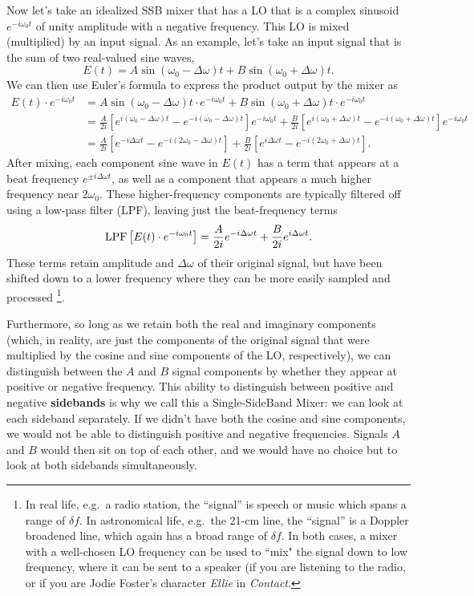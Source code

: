 \documentclass[12pt,preprint]{aastex}
\begin{document}
Now let's take an idealized SSB mixer that has a LO that
is a complex sinusoid $e^{-i\omega_0t}$ of unity amplitude with a negative frequency.  
This LO is mixed (multiplied) by an input signal. As an example, let's take an input signal
that is the sum of two real-valued sine waves,
\begin{equation}
E(t)=A\sin (\omega_0-\Delta\omega)t + B \sin (\omega_0+\Delta\omega)t.
\end{equation}
We can then use Euler's formula to express the product output by the mixer as
\begin{align}
E(t)\cdot e^{-i\omega_0t} &= A\sin (\omega_0-\Delta\omega)t\cdot e^{-i\omega_0t} + B \sin (\omega_0+\Delta\omega)t \cdot e^{-i\omega_0t}\\
&= \frac{A}{2i}\left[e^{i(\omega_0-\Delta\omega)t}-e^{-i(\omega_0-\Delta\omega)t}\right]e^{-i\omega_0t} +
  \frac{B}{2i}\left[e^{i(\omega_0+\Delta\omega)t}-e^{-i(\omega_0+\Delta\omega)t}\right]e^{-i\omega_0t}\\
&= \frac{A}{2i}\left[e^{-i\Delta\omega t}-e^{-i(2\omega_0-\Delta\omega)t}\right] +
  \frac{B}{2i}\left[e^{i\Delta\omega t}-e^{-i(2\omega_0+\Delta\omega)t}\right].
\end{align}
After mixing, each component sine wave in $E(t)$ has a term that appears at a beat frequency 
$e^{\pm i \Delta\omega t}$, as well as a component that appears a much higher frequency near $2\omega_0$.
These higher-frequency components are typically filtered off using a low-pass filter (LPF), leaving just the
beat-frequency terms
\begin{equation}
{\rm LPF}\left[E(t)\cdot e^{-i\omega_0t}\right] =
  \frac{A}{2i}e^{-i\Delta\omega t} + \frac{B}{2i} e^{i\Delta\omega t}.
\end{equation}
These terms retain amplitude and $\Delta\omega$ of their original signal, but have been shifted down
to a lower frequency where they can be more easily sampled and processed%
\footnote{In real life, e.g.\ a radio station, the ``signal'' is
speech or music which spans a range of $\delta f$. In astronomical life,
e.g.\ the 21-cm line, the ``signal'' is a Doppler broadened line, which
again has a broad range of $\delta f$.  In both cases, a mixer with a well-chosen
LO frequency can be used to ``mix" the signal down to low frequency, where it can
be sent to a speaker (if you are listening to the radio, or if you are Jodie Foster's
character {\it Ellie} in {\it Contact}.}.

Furthermore, so long as we retain both the real and imaginary components (which,
in reality, are just the components of the original signal that were multiplied by 
the cosine and sine components of the LO, respectively), we can distinguish 
between the $A$ and $B$ signal components by whether they appear at positive or negative
frequency.  This ability to distinguish between positive and negative {\bf sidebands}
is why we call this a Single-SideBand Mixer: we can look at each sideband separately.
If we didn't have both the cosine and sine components, we would not be able to distinguish
positive and negative frequencies. Signals $A$ and $B$ would then sit on top
of each other, and we would have no choice but to look at both sidebands simultaneously.
\end{document}
